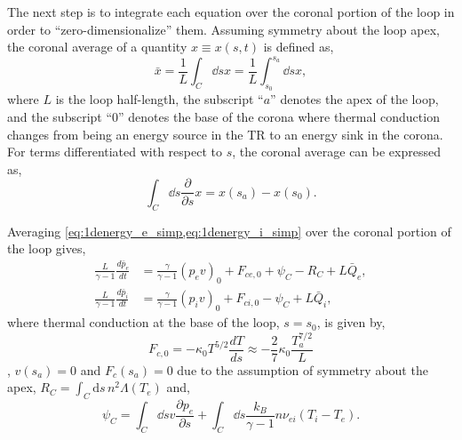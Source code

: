 The next step is to integrate each equation over the coronal portion of the loop in order to ``zero-dimensionalize'' them. Assuming symmetry about the loop apex, the coronal average of a quantity $x\equiv x(s,t)$ is defined as,
\begin{equation*}
    \bar{x} = \frac{1}{L}\int_C\dd{s}x = \frac{1}{L}\int_{s_0}^{s_a}\dd{s}x,
\end{equation*}
where $L$ is the loop half-length, the subscript ``$a$'' denotes the apex of the loop, and the subscript ``$0$'' denotes the base of the corona where thermal conduction changes from being an energy source in the TR to an energy sink in the corona. For terms differentiated with respect to $s$, the coronal average can be expressed as,
\begin{equation*}
    \int_C\dd{s}\frac{\partial}{\partial s}x = x(s_a) - x(s_0).
\end{equation*}

Averaging \cref{eq:1denergy_e_simp,eq:1denergy_i_simp} over the coronal portion of the loop gives,
\begin{align}
    \frac{L}{\gamma - 1}\frac{d \bar{p}_e}{dt} &= \frac{\gamma}{\gamma - 1}(p_ev)_0 + F_{ce,0} + \psi_C - R_C + L\bar{Q}_{e},\label{eq:1denergy_e_C} \\
    \frac{L}{\gamma - 1}\frac{d \bar{p}_i}{dt} &= \frac{\gamma}{\gamma - 1}(p_iv)_0 + F_{ci,0} - \psi_C + L\bar{Q}_{i},\label{eq:1denergy_i_C}
\end{align}
where thermal conduction at the base of the loop, $s=s_0$, is given by,
\begin{equation}\label{eq:heat-flux-ebtel}
    F_{c,0} = -\kappa_0T^{5/2}\frac{dT}{ds} \approx -\frac{2}{7}\kappa_0\frac{T_a^{7/2}}{L}
\end{equation}
\citep{klimchuk_highly_2008}, $v(s_a)=0$ and $F_c(s_a)=0$ due to the assumption of symmetry about the apex, $R_C=\int_C\mathrm{d}s\,n^2\Lambda(T_e)$ and,
\begin{equation}\label{eq:psi_c_full}
    \psi_C=\int_C\dd{s}v\frac{\partial p_e}{\partial s} + \int_C\dd{s}\frac{k_B}{\gamma - 1}n\nu_{ei}(T_i - T_e).
\end{equation}

